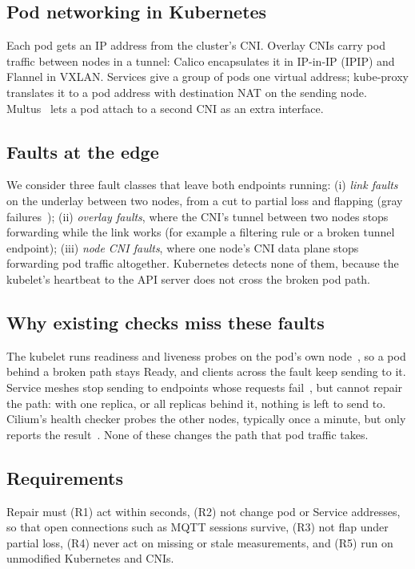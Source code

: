 \documentclass[conference,compsoc]{IEEEtran}
\begin{document}
\subsection{Pod networking in Kubernetes}
Each pod gets an IP address from the cluster's CNI. Overlay CNIs carry pod traffic
between nodes in a tunnel: Calico encapsulates it in IP-in-IP (IPIP) and Flannel in
VXLAN. Services give a group of pods one virtual address; kube-proxy translates it to
a pod address with destination NAT on the sending node. Multus~\cite{multus} lets a pod
attach to a second CNI as an extra interface.

\subsection{Faults at the edge}
We consider three fault classes that leave both endpoints running:
(i) \emph{link faults} on the underlay between two nodes, from a cut to partial loss
and flapping (gray failures~\cite{huang2017gray});
(ii) \emph{overlay faults}, where the CNI's tunnel between two nodes stops forwarding
while the link works (for example a filtering rule or a broken tunnel endpoint);
(iii) \emph{node CNI faults}, where one node's CNI data plane stops forwarding pod
traffic altogether. Kubernetes detects none of them, because the kubelet's heartbeat to
the API server does not cross the broken pod path.

\subsection{Why existing checks miss these faults}
The kubelet runs readiness and liveness probes on the pod's own node~\cite{k8sprobes},
so a pod behind a broken path stays Ready, and clients across the fault keep sending to
it. Service meshes stop sending to endpoints whose requests fail~\cite{istiooutlier},
but cannot repair the path: with one replica, or all replicas behind it, nothing is
left to send to. Cilium's health checker probes the other nodes, typically once a
minute, but only reports the result~\cite{ciliumhealth}. None of these changes the
path that pod traffic takes.

\subsection{Requirements}
Repair must (R1) act within seconds, (R2) not change pod or Service addresses, so that
open connections such as MQTT sessions survive, (R3) not flap under partial loss,
(R4) never act on missing or stale measurements, and (R5) run on unmodified Kubernetes
and CNIs.
\end{document}
